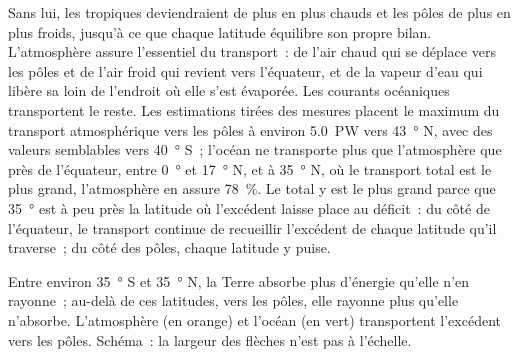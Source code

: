 Sans lui, les tropiques deviendraient de plus en plus chauds et les pôles de
plus en plus froids, jusqu'à ce que chaque latitude équilibre son propre
bilan. L'atmosphère assure l'essentiel du transport~: de l'air chaud qui
se déplace vers les pôles et de l'air froid qui revient vers l'équateur,
et de la vapeur d'eau qui libère sa  loin de l'endroit où
elle s'est évaporée. Les courants océaniques transportent le reste. Les
estimations tirées des mesures placent le maximum du transport
atmosphérique vers les pôles à environ \qty{5.0}{PW} vers
\qty{43}{\degree} N, avec des valeurs semblables vers \qty{40}{\degree} S~;
l'océan ne transporte plus que l'atmosphère que près de l'équateur, entre
\qty{0}{\degree} et \qty{17}{\degree} N, et à \qty{35}{\degree} N, où le
transport total est le plus grand, l'atmosphère en assure
\qty{78}{\percent}. Le total y est le plus grand parce que
\qty{35}{\degree} est à peu près la latitude où l'excédent laisse place au
déficit~: du côté de l'équateur, le transport continue de recueillir
l'excédent de chaque latitude qu'il traverse~; du côté des pôles, chaque
latitude y puise.

\begin{omfigure}

{\small Entre environ \qty{35}{\degree} S et \qty{35}{\degree} N, la Terre
absorbe plus d'énergie qu'elle n'en rayonne~; au-delà de ces latitudes,
vers les pôles, elle rayonne plus qu'elle n'absorbe. L'atmosphère (en
orange) et l'océan (en vert) transportent l'excédent vers les pôles.
Schéma~: la largeur des flèches n'est pas à l'échelle.}
\end{omfigure}

